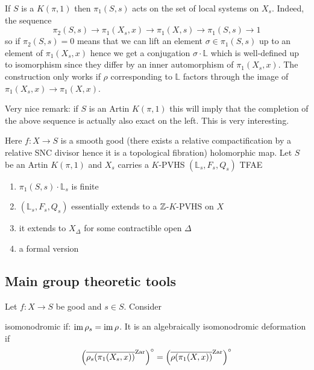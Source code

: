 \documentclass[12pt]{article}
\newcommand{\LL}{\mathbb{L}}
\newcommand{\Zar}{\mathrm{Zar}}
\begin{document}
\begin{rmk}
If $S$ is a $K(\pi, 1)$ then $\pi_1(S, s)$ acts on the set of local systems on $X_s$. Indeed, the sequence
\[ \pi_2(S, s) \to \pi_1(X_s, x) \to \pi_1(X, s) \to \pi_1(S, s) \to 1 \]
so if $\pi_2(S, s) = 0$ 
means that we can lift an element $\sigma \in \pi_1(S, s)$ up to an element of $\pi_1(X_s, x)$ hence we get a conjugation $\sigma \cdot \LL$ which is well-defined up to isomorphism since they differ by an inner automorphism of $\pi_1(X_s, x)$. The construction only works if $\rho$ corresponding to $\LL$ factors through the image of $\pi_1(X_s, x) \to \pi_1(X, x)$.
\end{rmk}


Very nice remark: if $S$ is an Artin $K(\pi, 1)$ this will imply that the completion of the above sequence is actually also exact on the left. This is very interesting.

\begin{theorem}[EK'24]
Here $f : X \to S$ is a smooth good (there exists a relative compactification by a relative SNC divisor hence it is a topological fibration) holomorphic map. Let $S$ be an Artin $K(\pi, 1)$ and $X_s$ carries a $K$-PVHS $(\LL_s, F_s, Q_s)$ TFAE
\begin{enumerate}
\item $\pi_1(S, s) \cdot \LL_s$ is finite
\item $(\LL_s, F_s, Q_s)$ essentially extends to a $\mathbb{Z}$-$K$-PVHS on $X$
\item it extends to $X_{\Delta}$ for some contractible open $\Delta$
\item a formal version
\end{enumerate}
\end{theorem} 

\subsection{Main group theoretic tools}

Let $f : X \to S$ be good and $s \in S$. Consider
\begin{center}
\end{center}
isomonodromic if: $\operatorname{\mathrm{im}}{\rho_s} = \operatorname{\mathrm{im}}{\rho}$. It is an algebraically isomonodromic deformation if
\[ \left( \ol{\rho_s(\pi_1(X_s, x))}^{\Zar} \right)^\circ = \left( \ol{\rho(\pi_1(X, x))}^{\Zar} \right)^\circ \]
\end{document}
